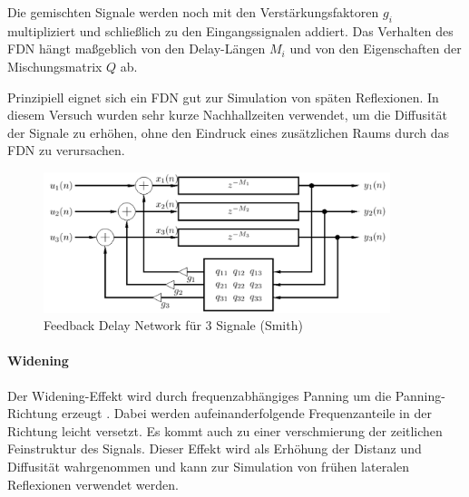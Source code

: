 Die gemischten Signale werden noch mit den Verstärkungsfaktoren $g_i$ multipliziert und schließlich zu den Eingangssignalen addiert. Das Verhalten des FDN hängt maßgeblich von den Delay-Längen $M_i$ und von den Eigenschaften der Mischungsmatrix $Q$ ab.

Prinzipiell eignet sich ein FDN gut zur Simulation von späten Reflexionen. In diesem Versuch wurden sehr kurze Nachhallzeiten verwendet, um die Diffusität der Signale zu erhöhen, ohne den Eindruck eines zusätzlichen Raums durch das FDN zu verursachen.

\begin{figure}[!ht]
  \centering
  \includegraphics[width=0.9\textwidth]{dekorrelation/pic/FDN_smith.png}
  \caption{Feedback Delay Network für 3 Signale (Smith) \protect\footnotemark }
  \label{fig:fdn}
\end{figure}


\paragraph{Widening}
Der Widening-Effekt wird durch frequenzabhängiges Panning um die Panning-Richtung erzeugt \cite{ambi-book}. Dabei werden aufeinanderfolgende Frequenzanteile in der Richtung leicht versetzt. Es kommt auch zu einer verschmierung der zeitlichen Feinstruktur des Signals. Dieser Effekt wird als Erhöhung der Distanz und Diffusität wahrgenommen und kann zur Simulation von frühen lateralen Reflexionen verwendet werden.

